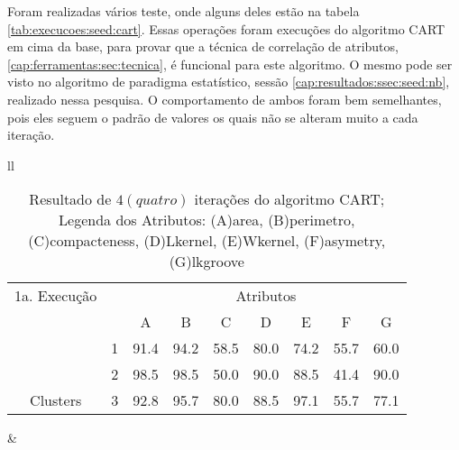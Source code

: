 Foram realizadas vários teste, onde alguns deles estão na tabela \ref{tab:execucoes:seed:cart}. Essas operações foram execuções do algoritmo CART em cima da base, para provar que a técnica de correlação de atributos, \ref{cap:ferramentas:sec:tecnica}, é funcional para este algoritmo. O mesmo pode ser visto no algoritmo de paradigma estatístico, sessão \ref{cap:resultados:ssec:seed:nb}, realizado nessa pesquisa. O  comportamento de ambos foram bem semelhantes, pois eles seguem o padrão de valores os quais não se alteram muito a cada iteração.

\begin{table}[!h]
\caption{Resultado de ${4(quatro)}$ iterações do algoritmo CART; Legenda dos Atributos: (A)area, (B)perimetro, (C)compacteness, (D)Lkernel, (E)Wkernel, (F)asymetry, (G)lkgroove}
 \begin{tabular}{ll}

  
   \small\addtolength{\tabcolsep}{-4pt}
     \begin{tabular}{|cl|c|c|c|c|c|c|c|}
        \hline \hline
           {\tiny  1a. Execução}      &   & \multicolumn{7}{c|}{Atributos}                                               \\ \cline{3-9} 
       \multicolumn{1}{|l}{}                            &   & A    & B & C & D & E & F & G \\ \hline
        \multicolumn{1}{|c|}{}                           & 1 & 91.4 & 94.2   & 58.5      & 80.0 & 74.2 & 55.7   & 60.0   \\ \cline{2-9} 
        \multicolumn{1}{|c|}{}                           & 2 & 98.5 & 98.5   & 50.0      & 90.0 & 88.5 & 41.4  & 90.0  \\ \cline{2-9} 
        \multicolumn{1}{|c|}{\multirow{-3}{*}{Clusters}} & 3 & 92.8 & 95.7   & 80.0      & 88.5 & 97.1 & 55.7  & 77.1  \\ \hline
      \end{tabular}
 &
 

\end{tabular}
\end{table}
